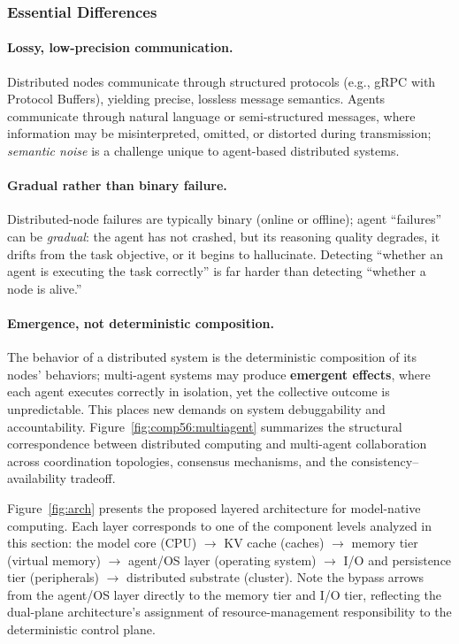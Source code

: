 \subsubsection{Essential Differences}

\paragraph{Lossy, low-precision communication.}
Distributed nodes communicate through structured protocols (e.g., gRPC with Protocol Buffers), yielding precise, lossless message semantics.
Agents communicate through natural language or semi-structured messages, where information may be misinterpreted, omitted, or distorted during transmission; \textit{semantic noise} is a challenge unique to agent-based distributed systems.

\paragraph{Gradual rather than binary failure.}
Distributed-node failures are typically binary (online or offline); agent ``failures'' can be \textit{gradual}: the agent has not crashed, but its reasoning quality degrades, it drifts from the task objective, or it begins to hallucinate.
Detecting ``whether an agent is executing the task correctly'' is far harder than detecting ``whether a node is alive.''

\paragraph{Emergence, not deterministic composition.}
The behavior of a distributed system is the deterministic composition of its nodes' behaviors; multi-agent systems may produce \textbf{emergent effects}, where each agent executes correctly in isolation, yet the collective outcome is unpredictable.
This places new demands on system debuggability and accountability.
Figure~\ref{fig:comp56:multiagent} summarizes the structural correspondence between distributed computing and multi-agent collaboration across coordination topologies, consensus mechanisms, and the consistency--availability tradeoff.




Figure~\ref{fig:arch} presents the proposed layered architecture for model-native computing.
Each layer corresponds to one of the component levels analyzed in this section: the model core (CPU) $\to$ KV cache (caches) $\to$ memory tier (virtual memory) $\to$ agent/OS layer (operating system) $\to$ I/O and persistence tier (peripherals) $\to$ distributed substrate (cluster).
Note the bypass arrows from the agent/OS layer directly to the memory tier and I/O tier, reflecting the dual-plane architecture's assignment of resource-management responsibility to the deterministic control plane.

